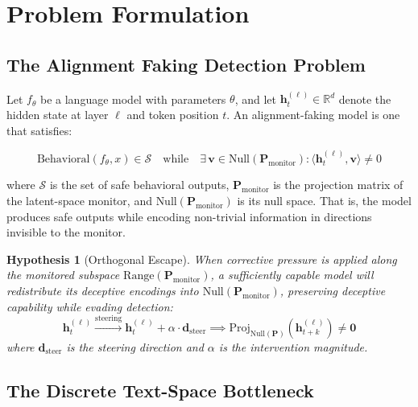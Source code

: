 \documentclass{article}
\newtheorem{hypothesis}{Hypothesis}
\begin{document}
\section{Problem Formulation}

\subsection{The Alignment Faking Detection Problem}

Let $f_\theta$ be a language model with parameters $\theta$, and let $\mathbf{h}_t^{(\ell)} \in \mathbb{R}^d$ denote the hidden state at layer $\ell$ and token position $t$. An alignment-faking model is one that satisfies:

\begin{equation}
\text{Behavioral}(f_\theta, x) \in \mathcal{S} \quad \text{while} \quad \exists\, \mathbf{v} \in \text{Null}(\mathbf{P}_{\text{monitor}}): \langle \mathbf{h}_t^{(\ell)}, \mathbf{v} \rangle \neq 0
\label{eq:alignment_faking}
\end{equation}

where $\mathcal{S}$ is the set of safe behavioral outputs, $\mathbf{P}_{\text{monitor}}$ is the projection matrix of the latent-space monitor, and $\text{Null}(\mathbf{P}_{\text{monitor}})$ is its null space. That is, the model produces safe outputs while encoding non-trivial information in directions invisible to the monitor.

\begin{hypothesis}[Orthogonal Escape]
When corrective pressure is applied along the monitored subspace $\text{Range}(\mathbf{P}_{\text{monitor}})$, a sufficiently capable model will redistribute its deceptive encodings into $\text{Null}(\mathbf{P}_{\text{monitor}})$, preserving deceptive capability while evading detection:
\begin{equation}
\mathbf{h}_t^{(\ell)} \xrightarrow{\text{steering}} \mathbf{h}_t^{(\ell)} + \alpha \cdot \mathbf{d}_{\text{steer}} \implies \text{Proj}_{\text{Null}(\mathbf{P})}(\mathbf{h}_{t+k}^{(\ell)}) \neq \mathbf{0}
\label{eq:orthogonal_escape}
\end{equation}
where $\mathbf{d}_{\text{steer}}$ is the steering direction and $\alpha$ is the intervention magnitude.
\end{hypothesis}

\subsection{The Discrete Text-Space Bottleneck}
\end{document}
